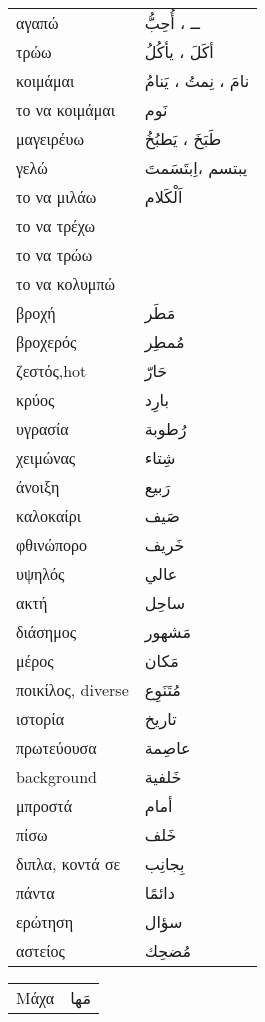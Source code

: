 \documentclass[twocolumn,a4paper]{article}
\newcommand{\ar}[1]{\textarabic{#1}}
\newcommand{\vrf}{\raisebox{0.15ex}{\footnotesize ◉}}
\newcommand{\vr}{\raisebox{0.15ex}{\footnotesize ◎}}
\newcommand{\mas}{\raisebox{0.15ex}{\footnotesize ◫}}
\begin{document}
\begin{mpsupertabular}{ P{0.5\textwidth} P{0.5\textwidth} }
αγαπώ \vr            & \ar{ ــ ، أُحِبُّ } \\  %
τρώω  \vrf           & \ar{ أكَلَ ، يأكُلُ }  \\
κοιμάμαι \vrf   & \ar{ نامَ ، نِمتُ ، يَنامُ }  \\
το να κοιμάμαι \mas      & \ar{ نَوم } \\
μαγειρέυω \vrf       & \ar{ طَبَخَ ، يَطبُخُ } \\
γελώ \vrf            & \ar{ يبتسم ،اِبتَسَمتَ }  \\
το να μιλάω \mas      & \ar{ اَلْكَلام } \\
το να τρέχω \mas      & \ar{  } \\
το να τρώω \mas      & \ar{  } \\
το να κολυμπώ \mas      & \ar{  } \\
βροχή                & \ar{ مَطَر } \\
βροχερός             & \ar{ مُمطِر } \\
ζεστός,hot           & \ar{ حَارّ } \\
κρύος                & \ar{ بارِد } \\
υγρασία              & \ar{ رُطوبة } \\
χειμώνας             & \ar{ شِتاء } \\
άνοιξη               & \ar{ رَبيع } \\
καλοκαίρι            & \ar{ صَيف } \\
φθινώπορο            & \ar{ خَريف } \\
υψηλός               & \ar{ عالي } \\
ακτή                 & \ar{ ساحِل } \\
διάσημος             & \ar{ مَشهور } \\
μέρος                & \ar{ مَكان } \\
ποικίλος, diverse    & \ar{ مُتَنَوِع } \\
ιστορία              & \ar{ تاريخ } \\
πρωτεύουσα           & \ar{ عاصِمة } \\
background           & \ar{ خَلفية } \\
μπροστά              & \ar{ أمام } \\
πίσω                 & \ar{ خَلف } \\
διπλα, κοντά σε      & \ar{ بِجانِب } \\
πάντα                & \ar{ دائمًا } \\
ερώτηση              & \ar{ سؤال } \\
αστείος              & \ar{ مُضحِك } \\

\end{mpsupertabular}
\clearpage

\begin{mpsupertabular}{ P{0.5\textwidth} P{0.5\textwidth} }
Μάχα               & \ar{ مَها } \\
\end{mpsupertabular}

\clearpage
\end{document}
